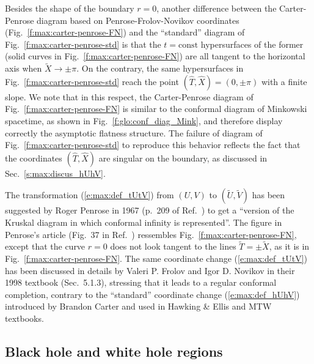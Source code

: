 Besides the shape of the boundary $r=0$, another difference between
the Carter-Penrose diagram based on Penrose-Frolov-Novikov coordinates
(Fig.~\ref{f:max:carter-penrose-FN}) and the ``standard'' diagram
of Fig.~\ref{f:max:carter-penrose-std} is that the $t=\mathrm{const}$
hypersurfaces of the former (solid curves in Fig.~\ref{f:max:carter-penrose-FN})
are all tangent to the horizontal axis when $\tilde{X}\rightarrow \pm\pi$.
On the contrary, the same hypersurfaces in Fig.~\ref{f:max:carter-penrose-std}
reach the point $(\hat{T},\hat{X}) = (0,\pm\pi)$ with a finite slope.
We note that in this respect, the Carter-Penrose diagram of
Fig.~\ref{f:max:carter-penrose-FN} is similar to the conformal diagram of
Minkowski spacetime, as shown in Fig.~\ref{f:glo:conf_diag_Mink}, and
therefore display correctly the asymptotic flatness structure.
The failure of diagram of Fig.~\ref{f:max:carter-penrose-std} to reproduce
this behavior reflects the fact that the coordinates $(\hat{T},\hat{X})$ are singular on the
boundary, as discussed in Sec.~\ref{s:max:discus_hUhV}.

\begin{hist}
\label{h:max:PFN_coord}
The transformation (\ref{e:max:def_tUtV}) from $(U,V)$ to $(\tilde{U},\tilde{V})$
has been suggested by Roger Penrose in 1967 (p.~209 of Ref.~\cite{Penro68})
to get a ``version of the Kruskal diagram in which conformal infinity is represented''.
The figure in Penrose's article (Fig.~37 in Ref.~\cite{Penro68})
ressembles Fig.~\ref{f:max:carter-penrose-FN}, except that the curve $r=0$ does
not look tangent to the lines $\tilde{T}  = \pm \tilde{X}$, as it is in
Fig.~\ref{f:max:carter-penrose-FN}.
The same coordinate change (\ref{e:max:def_tUtV}) has been
discussed in details by Valeri P. Frolov and Igor D. Novikov in their 1998 textbook \cite{FroloN98} (Sec.~5.1.3), stressing that it leads to
a regular conformal completion, contrary to the ``standard'' coordinate change (\ref{e:max:def_hUhV})
introduced by Brandon Carter \cite{Carte66} and used in Hawking \& Ellis \cite{HawkiE73}
and MTW \cite{MisneTW73} textbooks.
\end{hist}

\subsection{Black hole and white hole regions} \label{s:max:black_white}

